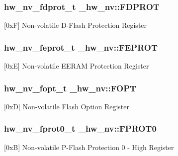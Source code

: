 \subsubsection[{\texorpdfstring{F\+D\+P\+R\+OT}{FDPROT}}]{ {\bf hw\+\_\+nv\+\_\+fdprot\+\_\+t} \+\_\+hw\+\_\+nv\+::\+F\+D\+P\+R\+OT}\hypertarget{struct__hw__nv_ad0c8d19dd4804bc970fdae2ccb6b2c8f}{}\label{struct__hw__nv_ad0c8d19dd4804bc970fdae2ccb6b2c8f}
\mbox{[}0xF\mbox{]} Non-\/volatile D-\/\+Flash Protection Register 
\subsubsection[{\texorpdfstring{F\+E\+P\+R\+OT}{FEPROT}}]{ {\bf hw\+\_\+nv\+\_\+feprot\+\_\+t} \+\_\+hw\+\_\+nv\+::\+F\+E\+P\+R\+OT}\hypertarget{struct__hw__nv_ac83dbc60550e94220cd52c75b0edd5a6}{}\label{struct__hw__nv_ac83dbc60550e94220cd52c75b0edd5a6}
\mbox{[}0xE\mbox{]} Non-\/volatile E\+E\+R\+AM Protection Register 
\subsubsection[{\texorpdfstring{F\+O\+PT}{FOPT}}]{ {\bf hw\+\_\+nv\+\_\+fopt\+\_\+t} \+\_\+hw\+\_\+nv\+::\+F\+O\+PT}\hypertarget{struct__hw__nv_a4446ec001a4bbd283a2f169a800c9eb6}{}\label{struct__hw__nv_a4446ec001a4bbd283a2f169a800c9eb6}
\mbox{[}0xD\mbox{]} Non-\/volatile Flash Option Register 
\subsubsection[{\texorpdfstring{F\+P\+R\+O\+T0}{FPROT0}}]{ {\bf hw\+\_\+nv\+\_\+fprot0\+\_\+t} \+\_\+hw\+\_\+nv\+::\+F\+P\+R\+O\+T0}\hypertarget{struct__hw__nv_afcb5adfe8d5091225cae0e58f4b0402d}{}\label{struct__hw__nv_afcb5adfe8d5091225cae0e58f4b0402d}
\mbox{[}0xB\mbox{]} Non-\/volatile P-\/\+Flash Protection 0 -\/ High Register 
